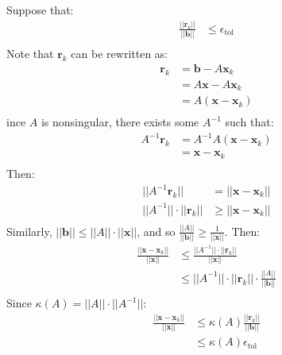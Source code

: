 \documentclass{article}
\begin{document}
\clearpage

\problem{}
Suppose that:
\begin{align*}
    \frac{||\mathbf{r}_k||}{||\mathbf{b}||} & \leq \epsilon_{\textrm{tol}} \\
\end{align*}
Note that $\mathbf{r}_k$ can be rewritten as:
\begin{align*}
    \mathbf{r}_k & = \mathbf{b} - A\mathbf{x}_k \\
    & = A\mathbf{x} - A\mathbf{x}_k \\
    & = A(\mathbf{x} - \mathbf{x}_k) \\
\end{align*}
ince $A$ is nonsingular, there exists some $A^{-1}$ such that:
\begin{align*}
    A^{-1}\mathbf{r}_k & = A^{-1}A(\mathbf{x} - \mathbf{x}_k) \\
    & = \mathbf{x} - \mathbf{x}_k \\
\end{align*}
Then:
\begin{align*}
    ||A^{-1}\mathbf{r}_k|| & = ||\mathbf{x} - \mathbf{x}_k|| \\
    ||A^{-1}|| \cdot ||\mathbf{r}_k|| & \geq ||\mathbf{x} - \mathbf{x}_k|| \\
\end{align*}
Similarly, $||\mathbf{b}|| \leq ||A|| \cdot ||\mathbf{x}||$, and so $\frac{||A||}{||\mathbf{b}||} \geq \frac{1}{||\mathbf{x}||}$. Then:
\begin{align*}
    \frac{||\mathbf{x} - \mathbf{x}_k||}{||\mathbf{x}||} & \leq \frac{||A^{-1}|| \cdot ||\mathbf{r}_k||}{||\mathbf{x}||} \\
    & \leq ||A^{-1}|| \cdot ||\mathbf{r}_k|| \cdot \frac{||A||}{||\mathbf{b}||} \\
\end{align*}
Since $\kappa(A) = ||A|| \cdot ||A^{-1}||$:
\begin{align*}
    \frac{||\mathbf{x} - \mathbf{x}_k||}{||\mathbf{x}||} & \leq \kappa(A) \frac{||\mathbf{r}_k||}{||\mathbf{b}||} \\
    & \leq \kappa(A)\epsilon_{\textrm{tol}}
\end{align*}
\end{document}

